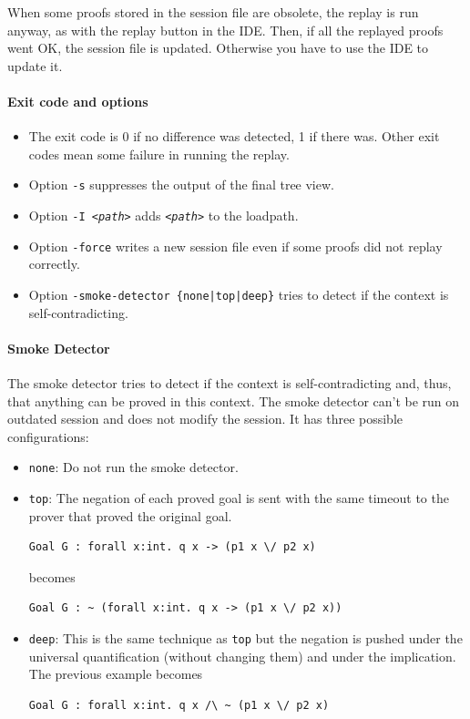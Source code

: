 When some proofs stored in the session file are obsolete, the replay is
run anyway, as with the replay button in the IDE. Then, if all the
replayed proofs went OK, the session file is updated. Otherwise you have
to use the IDE to update it.

\paragraph{Exit code and options}

\begin{itemize}
\item The exit code is 0 if no difference was detected, 1 if there
  was. Other exit codes mean some failure in running the replay.
\item Option \verb|-s| suppresses the output of the final tree view.
\item Option \texttt{-I \textsl{<path>}} adds \texttt{\textsl{<path>}} to the loadpath.
\item Option \verb|-force| writes a new session file even if
  some proofs did not replay correctly.
\item Option \texttt{-smoke-detector \{none|top|deep\}} tries to detect
  if the context is self-contradicting.
\end{itemize}

\paragraph{Smoke Detector}

The smoke detector tries to detect if the context is self-contradicting
 and, thus, that anything can be proved in this context. The smoke
 detector can't be run on outdated session and does not modify the session.
 It has three possible configurations:
 \begin{itemize}
\item \texttt{none}: Do not run the smoke detector.
\item \texttt{top}: The negation of each proved goal is sent with the
same timeout to the prover that proved the original goal.
\begin{verbatim}
Goal G : forall x:int. q x -> (p1 x \/ p2 x)
\end{verbatim}
becomes
\begin{verbatim}
Goal G : ~ (forall x:int. q x -> (p1 x \/ p2 x))
\end{verbatim}
\item \texttt{deep}: This is the same technique as \texttt{top} but the
   negation is pushed under the universal quantification (without
   changing them) and under the implication. The previous example becomes
\begin{verbatim}
Goal G : forall x:int. q x /\ ~ (p1 x \/ p2 x)
\end{verbatim}
 \end{itemize}

